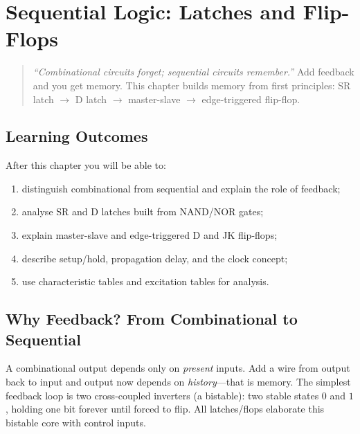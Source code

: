 \chapter{Sequential Logic: Latches and Flip-Flops}
\label{ch:sequential}

\begin{quote}
\emph{``Combinational circuits forget; sequential circuits remember.''}
Add feedback and you get memory. This chapter builds memory from first principles:
SR latch $\to$ D latch $\to$ master-slave $\to$ edge-triggered flip-flop.
\end{quote}

\noindent{}
\vspace{0.4em}

\section*{Learning Outcomes}
After this chapter you will be able to:
\begin{enumerate}[label=(L\arabic*)]
    \item distinguish combinational from sequential and explain the role of feedback;
    \item analyse SR and D latches built from NAND/NOR gates;
    \item explain master-slave and edge-triggered D and JK flip-flops;
    \item describe setup/hold, propagation delay, and the clock concept;
    \item use characteristic tables and excitation tables for analysis.
\end{enumerate}

\section{Why Feedback? From Combinational to Sequential}
\label{sec:feedback}
A combinational output depends only on \emph{present} inputs. Add a wire from output back to
input and output now depends on \emph{history}---that is memory. The simplest feedback loop is
two cross-coupled inverters (a bistable): two stable states $0$ and $1$, holding one bit forever
until forced to flip. All latches/flops elaborate this bistable core with control inputs.

